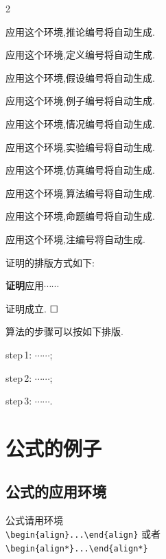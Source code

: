 \documentclass[authordraft]{ctacn}%
\begin{document}
\begin{multicols}{2}
\begin{tuilun}
	应用这个环境,推论编号将自动生成.
\end{tuilun}

\begin{dingyi}
	应用这个环境,定义编号将自动生成.
\end{dingyi}

\begin{jiashe}
	应用这个环境,假设编号将自动生成.
\end{jiashe}

\begin{li}
	应用这个环境,例子编号将自动生成.
\end{li}

\begin{qingkuang}
	应用这个环境,情况编号将自动生成.
\end{qingkuang}

\begin{shiyan}
	应用这个环境,实验编号将自动生成.
\end{shiyan}

\begin{fangzhen}
	应用这个环境,仿真编号将自动生成.
\end{fangzhen}

\begin{suanfa}
	应用这个环境,算法编号将自动生成.
\end{suanfa}


\begin{mingti}
	应用这个环境,命题编号将自动生成.
\end{mingti}

\begin{zhu}
	应用这个环境,注编号将自动生成.
\end{zhu}

证明的排版方式如下:

\textbf{证明}\quad 应用$\cdots\cdots$

证明成立. {\Large$\Square$}

算法的步骤可以按如下排版.

step\,1: $\cdots\cdots$;

step\,2: $\cdots\cdots$;

step\,3: $\cdots\cdots$.


\section{公式的例子}
\subsection{公式的应用环境}
公式请用环境\\
\verb|\begin{align}...\end{align}|
或者\\
\verb|\begin{align*}...\end{align*}|%

\end{multicols}
\end{document}
